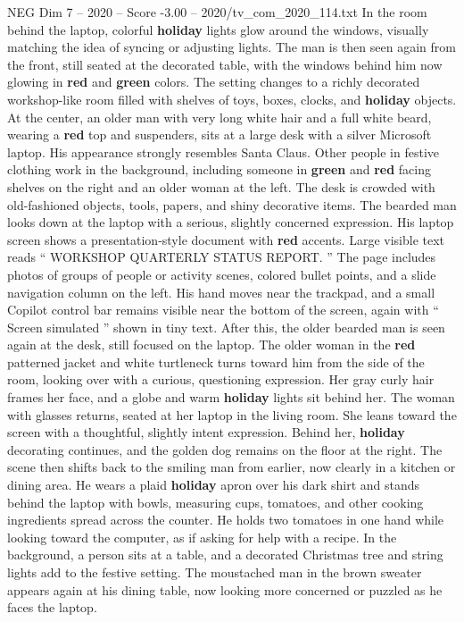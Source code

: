 \begin{textsample}{NEG Dim 7 – 2020 – Score -3.00 – 2020/tv\_com\_2020\_114.txt}
In the room behind the laptop, colorful \textbf{holiday} lights glow around the windows, visually matching the idea of syncing or adjusting lights.
The man is then seen again from the front, still seated at the decorated table, with the windows behind him now glowing in \textbf{red} and \textbf{green} colors.
The setting changes to a richly decorated workshop-like room filled with shelves of toys, boxes, clocks, and \textbf{holiday} objects.
At the center, an older man with very long white hair and a full white beard, wearing a \textbf{red} top and suspenders, sits at a large desk with a silver Microsoft laptop.
His appearance strongly resembles Santa Claus.
Other people in festive clothing work in the background, including someone in \textbf{green} and \textbf{red} facing shelves on the right and an older woman at the left.
The desk is crowded with old-fashioned objects, tools, papers, and shiny decorative items.
The bearded man looks down at the laptop with a serious, slightly concerned expression.
His laptop screen shows a presentation-style document with \textbf{red} accents.
Large visible text reads “ WORKSHOP QUARTERLY STATUS REPORT. ” The page includes photos of groups of people or activity scenes, colored bullet points, and a slide navigation column on the left.
His hand moves near the trackpad, and a small Copilot control bar remains visible near the bottom of the screen, again with “ Screen simulated ” shown in tiny text.
After this, the older bearded man is seen again at the desk, still focused on the laptop.
The older woman in the \textbf{red} patterned jacket and white turtleneck turns toward him from the side of the room, looking over with a curious, questioning expression.
Her gray curly hair frames her face, and a globe and warm \textbf{holiday} lights sit behind her.
The woman with glasses returns, seated at her laptop in the living room.
She leans toward the screen with a thoughtful, slightly intent expression.
Behind her, \textbf{holiday} decorating continues, and the golden dog remains on the floor at the right.
The scene then shifts back to the smiling man from earlier, now clearly in a kitchen or dining area.
He wears a plaid \textbf{holiday} apron over his dark shirt and stands behind the laptop with bowls, measuring cups, tomatoes, and other cooking ingredients spread across the counter.
He holds two tomatoes in one hand while looking toward the computer, as if asking for help with a recipe.
In the background, a person sits at a table, and a decorated Christmas tree and string lights add to the festive setting.
The moustached man in the brown sweater appears again at his dining table, now looking more concerned or puzzled as he faces the laptop.

\end{textsample}
